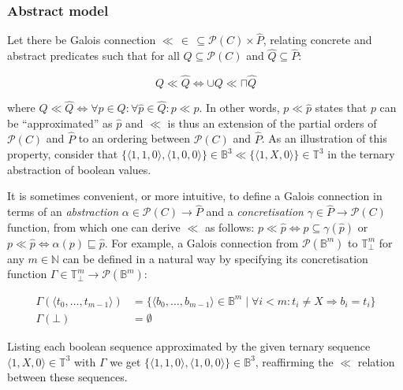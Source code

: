 \subsubsection{Abstract model}

Let there be Galois connection $\ll \, \in \, \subseteq \mathcal{P}(C) \times \hat P$, relating concrete and abstract predicates such that for all $Q \subseteq \mathcal{P}(C)$ and $\hat Q \subseteq \hat P$:

\begin{equation*}
Q \ll \hat Q \iff \cup Q \ll \sqcap \hat Q
\end{equation*}

\noindent where $Q \ll \hat Q \iff \forall p \in Q : \forall \hat p \in \hat Q : p \ll \hat p$. In other words, $p \ll \hat p$ states that $p$ can be ``approximated'' as $\hat p$ and $\ll$ is thus an extension of the partial orders of $\mathcal{P}(C)$ and $\hat P$ to an ordering between $\mathcal{P}(C)$ and $\hat P$. As an illustration of this property, consider that $\{ \langle 1,1,0 \rangle, \langle 1,0,0 \rangle \} \in \mathbb{B}^{3} \ll \{ \langle 1,X,0  \rangle \} \in \mathbb{T}^{3}$ in the ternary abstraction of boolean values.

It is sometimes convenient, or more intuitive, to define a Galois connection in terms of an \textit{abstraction} $\alpha \in \mathcal{P}(C) \rightarrow \hat P$ and a \textit{concretisation} $\gamma \in \hat P \rightarrow \mathcal{P}(C)$ function, from which one can derive $\ll$ as follows: $p \ll \hat p \iff p \subseteq \gamma(\hat p)$ or $p \ll \hat p \iff \alpha (p) \sqsubseteq \hat p$. For example, a Galois connection from $\mathcal{P}(\mathbb{B}^{m})$ to $\mathbb{T}_{\bot}^{m}$ for any $m \in \mathbb{N}$ can be defined in a natural way by specifying its concretisation function $\Gamma \in \mathbb{T}_{\bot}^{m} \rightarrow \mathcal{P}(\mathbb{B}^{m})$:

\begin{align*}
\Gamma ( \langle t_{0},\dots,t_{m-1} \rangle ) &= \{ \langle b_{0},\dots,b_{m-1} \rangle \in \mathbb{B}^{m} \mid \forall i < m : t_{i} \neq X \Rightarrow b_{i} = t_{i} \} \\
\Gamma ( \bot ) &= \emptyset
\end{align*}

\noindent Listing each boolean sequence approximated by the given ternary sequence $\langle 1,X,0  \rangle \in \mathbb{T}^{3}$ with $\Gamma$ we get $\{ \langle 1,1,0 \rangle, \langle 1,0,0 \rangle \} \in \mathbb{B}^{3}$, reaffirming the $\ll$ relation between these sequences.

